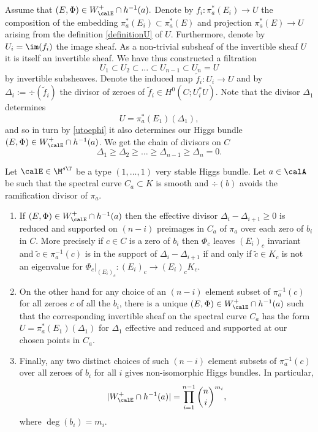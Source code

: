 Assume that $(E,\Phi)\in W^+_\calE\cap h^{-1}(a).$  Denote by $f_i:\pi_a^*(E_i)\to U$ the composition of the  embedding $\pi_a^*(E_i)\subset \pi_a^*(E)$ and projection $\pi_a^*(E)\to U$ arising from the definition \eqref{definitionU} of $U$. Furthermore, denote by $U_i=\im(f_i)$ the image sheaf.  As a non-trivial  subsheaf of the invertible sheaf $U$ it is itself an invertible sheaf. We have thus constructed a filtration $$U_1\subset U_2\subset \dots\subset U_{n-1}\subset U_{n}=U$$ by invertible subsheaves. Denote  the induced map $\tilde{f}_i: U_i\to U$ and by $\Delta_i:=\div(\tilde{f}_i)$ the divisor of zeroes of $\tilde{f}_i\in H^0(C;U_i^*U)$. Note that the divisor $\Delta_1$ determines $$U=\pi_a^*(E_1)(\Delta_1),$$ and so in turn by \eqref{utoephi} it also determines our Higgs bundle $(E,\Phi)\in W^+_\calE\cap h^{-1}(a)$. We get the chain of divisors on $C$ $$\Delta_1\geq \Delta_2\geq \dots \geq \Delta_{n-1}\geq \Delta_n=0.$$

\begin{proposition}
\notready \label{vsintersect} Let $\calE\in \M^{s\T}$ be a type $(1,...,1)$ very stable Higgs bundle. Let $a\in \calA$ be such that the spectral curve $C_a\subset K$ is smooth and $\div(b)$ avoids the ramification divisor of $\pi_a$. \begin{enumerate} \item  If $(E,\Phi)\in W^+_\calE\cap h^{-1}(a)$ then the effective divisor $\Delta_i-\Delta_{i+1}\geq 0$ is reduced and supported on  $(n-i)$ preimages in $C_a$ of $\pi_a$ over each zero of $b_i$ in $C$. More precisely if $c\in C$ is a zero of $b_i$ then $\Phi_c$ leaves $(E_i)_c$ invariant and  $\tilde{c}\in \pi_a^{-1}({c})$ is in the support of $\Delta_i-\Delta_{i+1}$ if and only if $\tilde{c}\in K_c$ is not an eigenvalue for $\Phi_c|_{(E_i)_c}:(E_i)_c\to(E_i)_c K_c $.

		\item 	On the other hand for any choice of an $(n-i)$ element subset of $\pi_a^{-1}(c)$ for all zeroes $c$ of all the $b_i$, there is a unique $(E,\Phi)\in W_\calE^+\cap h^{-1}(a)$ such that the corresponding invertible sheaf on the spectral curve $C_a$ has the form $U=\pi_a^*(E_1)(\Delta_1)$ for $\Delta_1$ effective and reduced and supported at our chosen points in $C_a$.

		\item	Finally, any two distinct choices of such $(n-i)$ element subsets of $\pi_a^{-1}(c)$ over all zeroes of $b_i$ for all $i$ gives non-isomorphic Higgs bundles. In particular, $$|W^+_\calE\cap h^{-1}(a)|= \prod_{i=1}^{n-1}{n\choose i}	^{m_i},$$ where $\deg(b_i)=m_i$. \end{enumerate}	\end{proposition}

